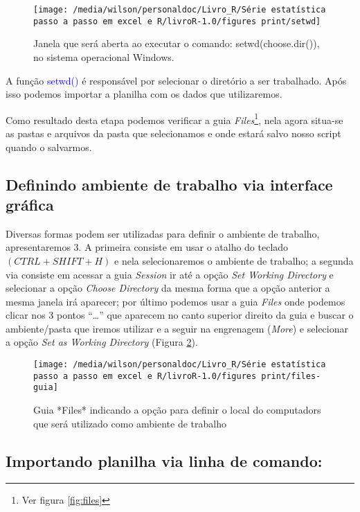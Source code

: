 \documentclass[14pt,titlepage, oneside, openany, a4paper]{book}
\begin{document}
\begin{figure}[H]
\texttt{[image: /media/wilson/personaldoc/Livro\_R/Série estatística passo a passo em excel e R/livroR-1.0/figures print/setwd]} \caption{Janela que será aberta ao executar o comando: setwd(choose.dir()), no sistema operacional Windows.}\label{fig:setwd}
\end{figure}

A função \textcolor{blue}{setwd()} é responsável por selecionar o diretório a ser trabalhado. Após isso podemos importar a planilha com os dados que utilizaremos.

Como resultado desta etapa podemos verificar a guia \emph{Files}\footnote{Ver figura \ref{fig:files}}, nela agora situa-se as pastas e arquivos da pasta que selecionamos e onde estará salvo nosso script quando o salvarmos.

\hypertarget{definindo-ambiente-de-trabalho-via-interface-gruxe1fica}{%
\subsection{Definindo ambiente de trabalho via interface gráfica}\label{definindo-ambiente-de-trabalho-via-interface-gruxe1fica}}

Diversas formas podem ser utilizadas para definir o ambiente de trabalho, apresentaremos 3. A primeira consiste em usar o atalho do teclado \((CTRL + SHIFT + H)\) e nela selecionaremos o ambiente de trabalho; a segunda via consiste em acessar a guia \emph{Session} ir até a opção \emph{Set Working Directory} e selecionar a opção \emph{Choose Directory} da mesma forma que a opção anterior a mesma janela irá aparecer; por último podemos usar a guia \emph{Files} onde podemos clicar nos 3 pontos ``\ldots{}'' que aparecem no canto superior direito da guia e buscar o ambiente/pasta que iremos utilizar e a seguir na engrenagem (\emph{More}) e selecionar a opção \emph{Set as Working Directory} (Figura \ref{fig:files-guia}).

\begin{figure}[H]
\texttt{[image: /media/wilson/personaldoc/Livro\_R/Série estatística passo a passo em excel e R/livroR-1.0/figures print/files-guia]} \caption{Guia *Files* indicando a opção para definir o local do computadors que será utilizado como ambiente de trabalho}\label{fig:files-guia}
\end{figure}

\hypertarget{importando-planilha-via-linha-de-comando}{%
\subsection{Importando planilha via linha de comando:}\label{importando-planilha-via-linha-de-comando}}
\end{document}
